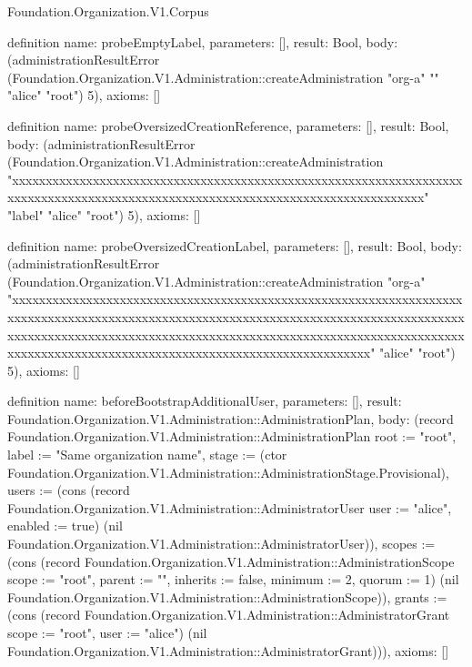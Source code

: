 \begin{lexlean}{Foundation.Organization.V1.Corpus}
\begin{semanticmodule}
definition{
  name: probeEmptyLabel,
  parameters: [],
  result: Bool,
  body: (administrationResultError (Foundation.Organization.V1.Administration::createAdministration "org-a" "" "alice" "root") 5),
  axioms: []
}

definition{
  name: probeOversizedCreationReference,
  parameters: [],
  result: Bool,
  body: (administrationResultError (Foundation.Organization.V1.Administration::createAdministration "xxxxxxxxxxxxxxxxxxxxxxxxxxxxxxxxxxxxxxxxxxxxxxxxxxxxxxxxxxxxxxxxxxxxxxxxxxxxxxxxxxxxxxxxxxxxxxxxxxxxxxxxxxxxxxxxxxxxxxxxxxxxxxxxx" "label" "alice" "root") 5),
  axioms: []
}

definition{
  name: probeOversizedCreationLabel,
  parameters: [],
  result: Bool,
  body: (administrationResultError (Foundation.Organization.V1.Administration::createAdministration "org-a" "xxxxxxxxxxxxxxxxxxxxxxxxxxxxxxxxxxxxxxxxxxxxxxxxxxxxxxxxxxxxxxxxxxxxxxxxxxxxxxxxxxxxxxxxxxxxxxxxxxxxxxxxxxxxxxxxxxxxxxxxxxxxxxxxxxxxxxxxxxxxxxxxxxxxxxxxxxxxxxxxxxxxxxxxxxxxxxxxxxxxxxxxxxxxxxxxxxxxxxxxxxxxxxxxxxxxxxxxxxxxxxxxxxxxxxxxxxxxxxxxxxxxxxxxxxxxxxxxx" "alice" "root") 5),
  axioms: []
}

definition{
  name: beforeBootstrapAdditionalUser,
  parameters: [],
  result: Foundation.Organization.V1.Administration::AdministrationPlan,
  body: (record Foundation.Organization.V1.Administration::AdministrationPlan {root := "root", label := "Same organization name", stage := (ctor Foundation.Organization.V1.Administration::AdministrationStage.Provisional), users := (cons (record Foundation.Organization.V1.Administration::AdministratorUser {user := "alice", enabled := true}) (nil Foundation.Organization.V1.Administration::AdministratorUser)), scopes := (cons (record Foundation.Organization.V1.Administration::AdministrationScope {scope := "root", parent := "", inherits := false, minimum := 2, quorum := 1}) (nil Foundation.Organization.V1.Administration::AdministrationScope)), grants := (cons (record Foundation.Organization.V1.Administration::AdministratorGrant {scope := "root", user := "alice"}) (nil Foundation.Organization.V1.Administration::AdministratorGrant))}),
  axioms: []
}


\end{semanticmodule}
\end{lexlean}
